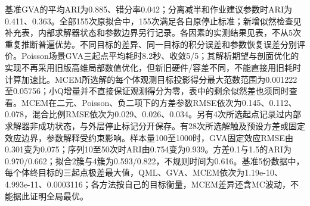 基准GVA的平均ARI为0.885、错分率0.042；分离减半和作业建议参数时ARI为0.411、0.363。全部155次原拟合中，155次满足各自原停止标准；新增似然检查见补充表，内部求解器状态和参数边界另行记录。各因素的实测结果见表，不从5次重复推断普遍优势。不同目标的差异、同一目标的积分误差和参数恢复误差分别评价。Poisson场景GVA三起点平均耗时8.2秒、收敛5/5；其解析期望与剖面优化的实现不再采用旧版高维局部数值优化，但新旧硬件/容差不同，不能直接用旧耗时计算加速比。MCEM所选解的每个体观测目标投影得分最大范数范围为0.001222至0.05756；小Q增量并不直接保证观测得分为零，表中的剩余似然差也须同时查看。MCEM在二元、Poisson、负二项下的方差参数RMSE依次为0.145、0.112、0.078，混合比例RMSE依次为0.029、0.026、0.034。另有4次所选起点记录过内部求解器非成功状态，与外层停止标记分开保存。有28次所选解触及预设方差或固定效应边界，参数解释受约束影响。样本量100至1000时，GVA固定效应RMSE由0.301变为0.075；序列10至50次时ARI由0.754变为0.939。方差0.1与1.5的ARI为0.970/0.662；拟合2簇与4簇为0.593/0.822，不规则时间为0.616。基准5份数据中，每个体终目标的三起点极差最大值，QML、GVA、MCEM依次为1.19e-10、4.993e-11、0.0003116；各方法按自己的目标衡量，MCEM差异还含MC波动，不能据此证明全局最优。